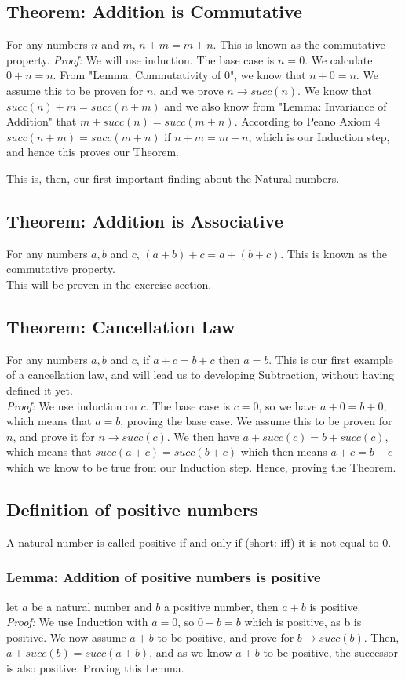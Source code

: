 \subsection{Theorem: Addition is Commutative}
For any numbers $n$ and $m$, $n + m = m + n$. This is known as the commutative property.
\textit{Proof:} We will use induction. The base case is $n = 0$. We calculate $0 + n = n$. From "Lemma: Commutativity of 0", we know that $n + 0 = n$. We assume this to be proven for $n$, and we prove $n\rightarrow succ(n)$. We know that $succ(n) + m = succ(n + m)$ and we also know from "Lemma: Invariance of Addition" that $m + succ(n) = succ(m + n)$. According to Peano Axiom 4 $succ(n+m) = succ(m+n)$ if $n+m=m+n$, which is our Induction step, and hence this proves our Theorem.

This is, then, our first important finding about the Natural numbers.

\subsection{Theorem: Addition is Associative}
For any numbers $a,b$ and $c$, $(a+b)+c = a+(b+c)$. This is known as the commutative property.\\
This will be proven in the exercise section.

\subsection{Theorem: Cancellation Law}
For any numbers $a,b$ and $c$, if $a + c = b + c$ then $a = b$. This is our first example of a cancellation law, and will lead us to developing Subtraction, without having defined it yet.\\
\textit{Proof:} We use induction on $c$. The base case is $c = 0$, so we have $a + 0 = b + 0$, which means that $a = b$, proving the base case. We assume this to be proven for $n$, and prove it for $n\rightarrow succ(c)$. We then have $a + succ(c) = b + succ(c)$, which means that $succ (a+c) = succ(b+c)$ which then means $a+c = b+c$ which we know to be true from our Induction step. Hence, proving the Theorem.

\subsection{Definition of positive numbers}
A natural number is called positive if and only if (short: iff) it is not equal to 0.

\subsubsection*{Lemma: Addition of positive numbers is positive}
let $a$ be a natural number and $b$ a positive number, then $a + b$ is positive.\\
\textit{Proof:} We use Induction with $a = 0$, so $0 + b = b$ which is positive, as b is positive. We now assume $a+b$ to be positive, and prove for $b\rightarrow succ(b)$. Then, $a + succ(b) = succ(a + b)$, and as we know $a+b$ to be positive, the successor is also positive. Proving this Lemma.

